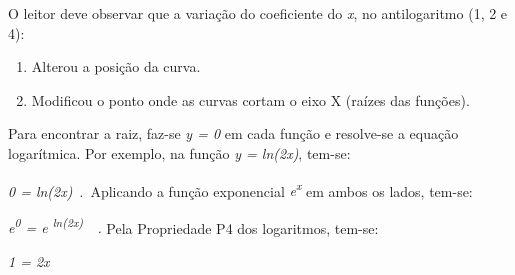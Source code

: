 \documentclass[12pt]{article}
\begin{document}
\vspace{\baselineskip}

\vspace{\baselineskip}
\begin{adjustwidth}{0.39in}{0.0in}
O leitor deve observar que a variação do coeficiente do \textit{x}, no antilogaritmo (1, 2 e 4):\par

\end{adjustwidth}

\begin{enumerate}
	\item Alterou a posição da curva.\par

	\item Modificou o ponto onde as curvas cortam o eixo X (raízes das funções). 
\end{enumerate}\par


\vspace{\baselineskip}
\begin{adjustwidth}{0.39in}{0.0in}
Para encontrar a raiz, faz-se \textit{y = 0} em cada função e resolve-se a equação logarítmica. Por exemplo, na função \textit{y = ln(2x)}, tem-se:\par

\end{adjustwidth}


\vspace{\baselineskip}
\begin{adjustwidth}{0.39in}{0.0in}
\textit{0 = ln(2x)}\  .\  Aplicando a função exponencial \textit{e\textsuperscript{x}} em ambos os lados, tem-se:\par

\end{adjustwidth}


\vspace{\baselineskip}
\begin{adjustwidth}{0.39in}{0.0in}
\textit{e\textsuperscript{0} = e \textsuperscript{ln(2x)}\ \  . }Pela Propriedade P4 dos logaritmos, tem-se:\par

\end{adjustwidth}

\begin{adjustwidth}{0.39in}{0.0in}
\textit{1 = 2x}\par

\end{adjustwidth}
\end{document}
